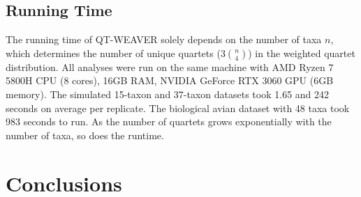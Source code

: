 \documentclass[10pt,a4paper]{article}
\begin{document}
\subsection{Running Time}
The running time of QT-WEAVER solely depends on the number of taxa $n$, which determines the number of unique quartets ($3$$n \choose 4$) in the weighted quartet distribution.
All analyses were run on the same machine with AMD Ryzen 7 5800H CPU (8 cores), 16GB RAM, NVIDIA GeForce RTX 3060 GPU (6GB memory). The simulated 15-taxon and 37-taxon datasets took 1.65 and 242 seconds on average per replicate. The biological avian dataset with 48 taxa took 983 seconds to run. As the number of quartets grows exponentially with the number of taxa, so does the runtime.

        


\section{Conclusions}
\end{document}
